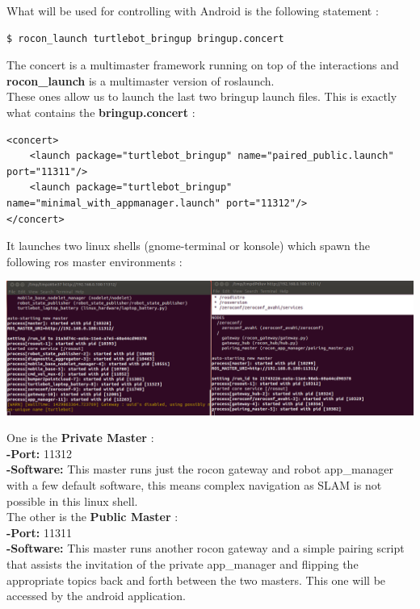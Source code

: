 \documentclass[10pt,a4paper]{article}
\begin{document}
What will be used for controlling with Android is the following statement : 
\begin{lstlisting}[frame=single]
$ rocon_launch turtlebot_bringup bringup.concert
\end{lstlisting}


 The concert is a multimaster framework running on top of the interactions and \textbf{rocon\_launch} is a multimaster version of roslaunch.\\
 
These ones allow us to launch the last two bringup launch files.
This is exactly what contains the \textbf{bringup.concert} : 
\begin{lstlisting}[frame=single]
<concert>
    <launch package="turtlebot_bringup" name="paired_public.launch" port="11311"/>
    <launch package="turtlebot_bringup" name="minimal_with_appmanager.launch" port="11312"/>
</concert>
\end{lstlisting}

It launches two linux shells (gnome-terminal or konsole) which spawn the following ros master environments : 

\begin{center}
\includegraphics[scale=0.4]{images/twoMasters.png}
\end{center}

One is the \textbf{Private Master} : \\
\textbf{-Port:} 11312 \\
\textbf{-Software:} This master runs just the rocon gateway and robot app\_manager with a few default software, this means complex navigation as SLAM is not possible in this linux shell.\\

The other is the \textbf{Public Master} : \\
\textbf{-Port:} 11311 \\
\textbf{-Software:} This master runs another rocon gateway and a simple pairing script that assists the invitation of the private app\_manager and flipping the appropriate topics back and forth between the two masters. This one will be accessed by the android application. 
\end{document}
